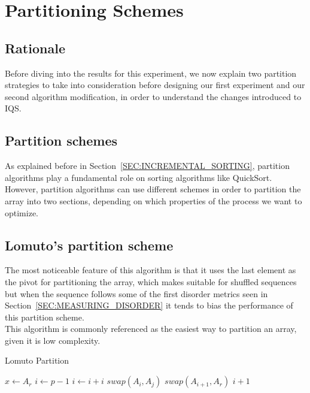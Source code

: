\section{Partitioning Schemes}
\label{SECTION:PARTITIONING_SCHEMES}

\subsection{Rationale}
Before diving into the results for this experiment, we now explain two partition strategies to take into consideration before designing our first experiment and our second algorithm modification, in order to understand the changes introduced to IQS.\\

\subsection{Partition schemes}
As explained before in Section~\ref{SEC:INCREMENTAL_SORTING}, partition algorithms play a fundamental role on sorting algorithms like QuickSort. However, partition algorithms can use different schemes in order to partition the array into two sections, depending on which properties of the process we want to optimize.\\

\subsection{Lomuto's partition scheme}

The most noticeable feature of this algorithm is that it uses the last element as the pivot for partitioning the array, which makes suitable for shuffled sequences but when the sequence follows some of the first disorder metrics seen in Section~\ref{SEC:MEASURING_DISORDER} it tends to bias the performance of this partition scheme.\\

This algorithm is commonly referenced as the easiest way to partition an array, given it is low complexity.\\

\begin{algorithm}
\caption{Lomuto Partition}\label{ALG:LOMUTO_PARTITION}
\begin{algorithmic}[1]
     
    \State $x \gets A_r$
    \State $i \gets p-1$
        \State $i \gets i + i$
        \State $swap(A_i, A_j)$
    \EndIf
    \EndFor
    \State $swap(A_{i+1}, A_r)$
    \State \Return $i + 1$
    \EndProcedure
\end{algorithmic}
\end{algorithm}

